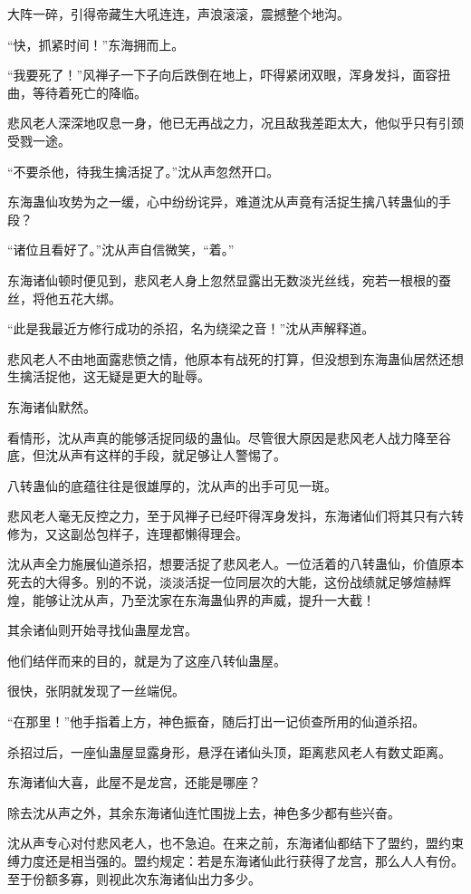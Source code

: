 \begin{this_body}
大阵一碎，引得帝藏生大吼连连，声浪滚滚，震撼整个地沟。

“快，抓紧时间！”东海拥而上。

“我要死了！”风禅子一下子向后跌倒在地上，吓得紧闭双眼，浑身发抖，面容扭曲，等待着死亡的降临。

悲风老人深深地叹息一身，他已无再战之力，况且敌我差距太大，他似乎只有引颈受戮一途。

“不要杀他，待我生擒活捉了。”沈从声忽然开口。

东海蛊仙攻势为之一缓，心中纷纷诧异，难道沈从声竟有活捉生擒八转蛊仙的手段？

“诸位且看好了。”沈从声自信微笑，“着。”

东海诸仙顿时便见到，悲风老人身上忽然显露出无数淡光丝线，宛若一根根的蚕丝，将他五花大绑。

“此是我最近方修行成功的杀招，名为绕梁之音！”沈从声解释道。

悲风老人不由地面露悲愤之情，他原本有战死的打算，但没想到东海蛊仙居然还想生擒活捉他，这无疑是更大的耻辱。

东海诸仙默然。

看情形，沈从声真的能够活捉同级的蛊仙。尽管很大原因是悲风老人战力降至谷底，但沈从声有这样的手段，就足够让人警惕了。

八转蛊仙的底蕴往往是很雄厚的，沈从声的出手可见一斑。

悲风老人毫无反控之力，至于风禅子已经吓得浑身发抖，东海诸仙们将其只有六转修为，又这副怂包样子，连理都懒得理会。

沈从声全力施展仙道杀招，想要活捉了悲风老人。一位活着的八转蛊仙，价值原本死去的大得多。别的不说，淡淡活捉一位同层次的大能，这份战绩就足够煊赫辉煌，能够让沈从声，乃至沈家在东海蛊仙界的声威，提升一大截！

其余诸仙则开始寻找仙蛊屋龙宫。

他们结伴而来的目的，就是为了这座八转仙蛊屋。

很快，张阴就发现了一丝端倪。

“在那里！”他手指着上方，神色振奋，随后打出一记侦查所用的仙道杀招。

杀招过后，一座仙蛊屋显露身形，悬浮在诸仙头顶，距离悲风老人有数丈距离。

东海诸仙大喜，此屋不是龙宫，还能是哪座？

除去沈从声之外，其余东海诸仙连忙围拢上去，神色多少都有些兴奋。

沈从声专心对付悲风老人，也不急迫。在来之前，东海诸仙都结下了盟约，盟约束缚力度还是相当强的。盟约规定：若是东海诸仙此行获得了龙宫，那么人人有份。至于份额多寡，则视此次东海诸仙出力多少。


\end{this_body}
